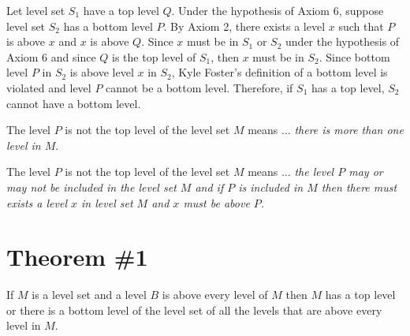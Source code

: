 \documentclass[12pt]{article}
\begin{document}
\problem
\solutionAlt
Let level set $S_1$ have a top level $Q$. Under the hypothesis of Axiom 6, suppose level set $S_2$ has a bottom level $P$. By Axiom 2, there exists a level $x$ such that $P$ is above $x$ and $x$ is above $Q$. Since $x$ must be in $S_1$ or $S_2$ under the hypothesis of Axiom 6 and since $Q$ is the top level of $S_1$, then $x$ must be in $S_2$. Since bottom level $P$ in $S_2$ is above level $x$ in $S_2$, Kyle Foster's definition of a bottom level is violated and level $P$ cannot be a bottom level. Therefore, if $S_1$ has a top level, $S_2$ cannot have a bottom level.


\problem
The level $P$ is not the top level of the level set $M$ means $\dots$ \textit{there is more than one level in $M$}.

The level $P$ is not the top level of the level set $M$ means $\dots$ \textit{the level $P$ may or may not be included in the level set $M$ and if $P$ is included in $M$ then there must exists a level $x$ in level set $M$ and $x$ must be above $P$.}


\section*{Theorem \#1}
\begin{theorem}
    If $M$ is a level set and a level $B$ is above every level of $M$ then $M$ has a top level or there is a bottom level of the level set of all the levels that are above every level in $M$.
\end{theorem}
\end{document}
